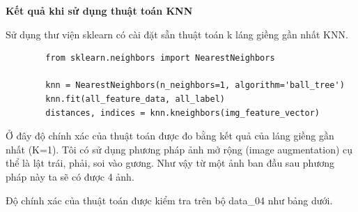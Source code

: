 \documentclass[12pt]{report}
\begin{document}
		\textbf{Kết quả khi sử dụng thuật toán KNN}
						
		Sử dụng thư viện sklearn có cài đặt sẵn thuật toán k láng giềng gần nhất KNN.
		\begin{lstlisting}
		from sklearn.neighbors import NearestNeighbors

		knn = NearestNeighbors(n_neighbors=1, algorithm='ball_tree')
		knn.fit(all_feature_data, all_label)
		distances, indices = knn.kneighbors(img_feature_vector)
		\end{lstlisting}
				
		Ở đây độ chính xác của thuật toán được đo bằng kết quả của láng giềng gần nhất (K=1). Tôi có sử dụng phương pháp ảnh mở rộng (image augmentation) cụ thể là lật trái, phải, soi vào gương. Như vậy từ một ảnh ban đầu sau phương pháp này ta sẽ có được 4 ảnh.
						
		Độ chính xác của thuật toán được kiểm tra trên bộ data\_04 như bảng dưới.
				
\end{document}
